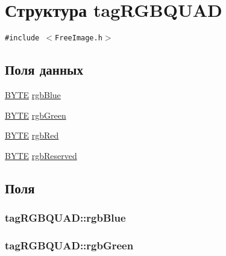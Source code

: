 \hypertarget{structtag_r_g_b_q_u_a_d}{
\section{Структура tagRGBQUAD}
\label{structtag_r_g_b_q_u_a_d}
}
{\tt \#include $<$FreeImage.h$>$}

\subsection*{Поля данных}
\begin{CompactItemize}
\item 
\hyperlink{filtration__run_2free_image_2_free_image_8h_ae9749d96e15ccb4f482dd5f55d98f9b}{BYTE} \hyperlink{structtag_r_g_b_q_u_a_d_d99c50770a73c6fae3ee1ea627da1c60}{rgbBlue}
\item 
\hyperlink{filtration__run_2free_image_2_free_image_8h_ae9749d96e15ccb4f482dd5f55d98f9b}{BYTE} \hyperlink{structtag_r_g_b_q_u_a_d_4dae0a7db2f4d432cb4da3de4ef337bd}{rgbGreen}
\item 
\hyperlink{filtration__run_2free_image_2_free_image_8h_ae9749d96e15ccb4f482dd5f55d98f9b}{BYTE} \hyperlink{structtag_r_g_b_q_u_a_d_a143fcd3ff08a04b152bee9d410821a6}{rgbRed}
\item 
\hyperlink{filtration__run_2free_image_2_free_image_8h_ae9749d96e15ccb4f482dd5f55d98f9b}{BYTE} \hyperlink{structtag_r_g_b_q_u_a_d_2758aec56e37d4f3f5fde511a58f4f82}{rgbReserved}
\end{CompactItemize}


\subsection{Поля}
\hypertarget{structtag_r_g_b_q_u_a_d_d99c50770a73c6fae3ee1ea627da1c60}{
\subsubsection[{rgbBlue}]{ {\bf tagRGBQUAD::rgbBlue}}}
\label{structtag_r_g_b_q_u_a_d_d99c50770a73c6fae3ee1ea627da1c60}


\hypertarget{structtag_r_g_b_q_u_a_d_4dae0a7db2f4d432cb4da3de4ef337bd}{
\subsubsection[{rgbGreen}]{ {\bf tagRGBQUAD::rgbGreen}}}
\label{structtag_r_g_b_q_u_a_d_4dae0a7db2f4d432cb4da3de4ef337bd}


